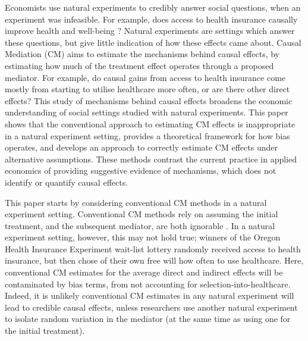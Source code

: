 Economists use natural experiments to credibly answer social questions, when an experiment was infeasible.
For example, does access to health insurance causally improve health and well-being \citep{finkelstein2008oregon}?
Natural experiments are settings which answer these questions, but give little indication of how these effects came about.
Causal Mediation (CM) aims to estimate the mechanisms behind causal effects, by estimating how much of the treatment effect operates through a proposed mediator.
For example, do causal gains from access to health insurance come mostly from starting to utilise healthcare more often, or are there other direct effects?
This study of mechanisms behind causal effects broadens the economic understanding of social settings studied with natural experiments.
This paper shows that the conventional approach to estimating CM effects is inappropriate in a natural experiment setting, provides a theoretical framework for how bias operates, and develops an approach to correctly estimate CM effects under alternative assumptions.
These methods contrast the current practice in applied economics of providing suggestive evidence of mechanisms, which does not identify or quantify causal effects.


This paper starts by considering conventional CM methods in a natural experiment setting.
Conventional CM methods rely on assuming the initial treatment, and the subsequent mediator, are both ignorable \citep{imai2010identification}.
In a natural experiment setting, however, this may not hold true; 
winners of the Oregon Health Insurance Experiment wait-list lottery randomly received access to health insurance, but then chose of their own free will how often to use healthcare.
Here, conventional CM estimates for the average direct and indirect effects will be contaminated by bias terms, from not accounting for selection-into-healthcare.
Indeed, it is unlikely conventional CM estimates in any natural experiment will lead to credible causal effects, unless researchers use another natural experiment to isolate random variation in the mediator (at the same time as using one for the initial treatment).

